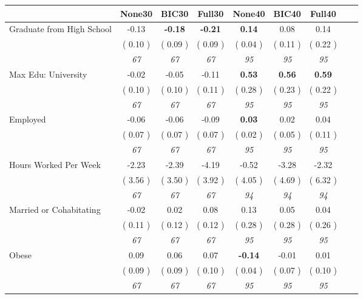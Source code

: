 \begin{tabular}{l c c c c c c c c}
\toprule
 & None30 & BIC30 & Full30 & None40 & BIC40 & Full40 \\
\midrule
Graduate from High School &     -0.13 & \textbf{     -0.18 } & \textbf{     -0.21 } & \textbf{      0.14 } &      0.08 &      0.14 \\
& (     0.10 ) & (     0.09 ) & (     0.09 ) & (     0.04 ) & (     0.11 ) & (     0.22 ) \\
& \textit{ 67 } & \textit{ 67 } & \textit{ 67 } & \textit{ 95 } & \textit{ 95 } & \textit{ 95 } \\
Max Edu: University &     -0.02 &     -0.05 &     -0.11 & \textbf{      0.53 } & \textbf{      0.56 } & \textbf{      0.59 } \\
& (     0.10 ) & (     0.10 ) & (     0.11 ) & (     0.28 ) & (     0.23 ) & (     0.22 ) \\
& \textit{ 67 } & \textit{ 67 } & \textit{ 67 } & \textit{ 95 } & \textit{ 95 } & \textit{ 95 } \\
Employed &     -0.06 &     -0.06 &     -0.09 & \textbf{      0.03 } &      0.02 &      0.04 \\
& (     0.07 ) & (     0.07 ) & (     0.07 ) & (     0.02 ) & (     0.05 ) & (     0.11 ) \\
& \textit{ 67 } & \textit{ 67 } & \textit{ 67 } & \textit{ 95 } & \textit{ 95 } & \textit{ 95 } \\
Hours Worked Per Week &     -2.23 &     -2.39 &     -4.19 &     -0.52 &     -3.28 &     -2.32 \\
& (     3.56 ) & (     3.50 ) & (     3.92 ) & (     4.05 ) & (     4.69 ) & (     6.32 ) \\
& \textit{ 67 } & \textit{ 67 } & \textit{ 67 } & \textit{ 94 } & \textit{ 94 } & \textit{ 94 } \\
Married or Cohabitating &     -0.02 &      0.02 &      0.08 &      0.13 &      0.05 &      0.04 \\
& (     0.11 ) & (     0.12 ) & (     0.12 ) & (     0.28 ) & (     0.28 ) & (     0.26 ) \\
& \textit{ 67 } & \textit{ 67 } & \textit{ 67 } & \textit{ 95 } & \textit{ 95 } & \textit{ 95 } \\
Obese &      0.09 &      0.06 &      0.07 & \textbf{     -0.14 } &     -0.01 &      0.01 \\
& (     0.09 ) & (     0.09 ) & (     0.10 ) & (     0.04 ) & (     0.07 ) & (     0.10 ) \\
& \textit{ 67 } & \textit{ 67 } & \textit{ 67 } & \textit{ 95 } & \textit{ 95 } & \textit{ 95 } \\

\end{tabular}
